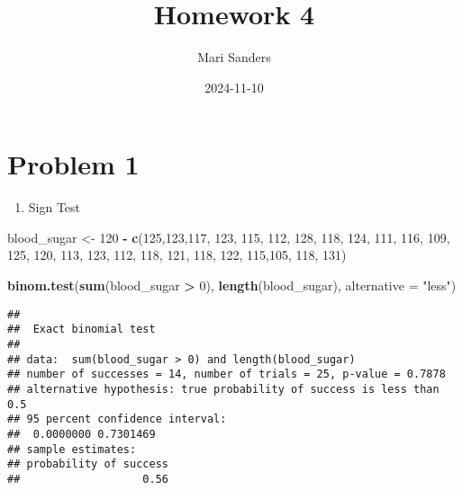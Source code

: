 \documentclass[
]{article}
\title{Homework 4}
\author{Mari Sanders}
\date{2024-11-10}
\newenvironment{Shaded}{\begin{snugshade}}{\end{snugshade}}
\newcommand{\AttributeTok}[1]{\textcolor[rgb]{0.13,0.29,0.53}{#1}}
\newcommand{\DecValTok}[1]{\textcolor[rgb]{0.00,0.00,0.81}{#1}}
\newcommand{\FunctionTok}[1]{\textcolor[rgb]{0.13,0.29,0.53}{\textbf{#1}}}
\newcommand{\NormalTok}[1]{#1}
\newcommand{\OtherTok}[1]{\textcolor[rgb]{0.56,0.35,0.01}{#1}}
\newcommand{\SpecialCharTok}[1]{\textcolor[rgb]{0.81,0.36,0.00}{\textbf{#1}}}
\newcommand{\StringTok}[1]{\textcolor[rgb]{0.31,0.60,0.02}{#1}}
\providecommand{\tightlist}{%
  \setlength{\itemsep}{0pt}\setlength{\parskip}{0pt}}
\begin{document}
\maketitle

\section{Problem 1}\label{problem-1}

\begin{enumerate}
\def\labelenumi{\alph{enumi})}
\tightlist
\item
  Sign Test
\end{enumerate}

\begin{Shaded}
\begin{Highlighting}[]
\NormalTok{blood\_sugar }\OtherTok{\textless{}{-}} \DecValTok{120} \SpecialCharTok{{-}} \FunctionTok{c}\NormalTok{(}\DecValTok{125}\NormalTok{,}\DecValTok{123}\NormalTok{,}\DecValTok{117}\NormalTok{, }\DecValTok{123}\NormalTok{, }\DecValTok{115}\NormalTok{, }\DecValTok{112}\NormalTok{, }\DecValTok{128}\NormalTok{, }\DecValTok{118}\NormalTok{, }\DecValTok{124}\NormalTok{, }\DecValTok{111}\NormalTok{, }\DecValTok{116}\NormalTok{, }
                       \DecValTok{109}\NormalTok{, }\DecValTok{125}\NormalTok{, }\DecValTok{120}\NormalTok{, }\DecValTok{113}\NormalTok{, }\DecValTok{123}\NormalTok{, }\DecValTok{112}\NormalTok{, }\DecValTok{118}\NormalTok{, }\DecValTok{121}\NormalTok{, }\DecValTok{118}\NormalTok{, }\DecValTok{122}\NormalTok{, }\DecValTok{115}\NormalTok{,}\DecValTok{105}\NormalTok{, }
                       \DecValTok{118}\NormalTok{, }\DecValTok{131}\NormalTok{)}

\FunctionTok{binom.test}\NormalTok{(}\FunctionTok{sum}\NormalTok{(blood\_sugar }\SpecialCharTok{\textgreater{}} \DecValTok{0}\NormalTok{), }\FunctionTok{length}\NormalTok{(blood\_sugar), }\AttributeTok{alternative =} \StringTok{"less"}\NormalTok{)}
\end{Highlighting}
\end{Shaded}

\begin{verbatim}
## 
##  Exact binomial test
## 
## data:  sum(blood_sugar > 0) and length(blood_sugar)
## number of successes = 14, number of trials = 25, p-value = 0.7878
## alternative hypothesis: true probability of success is less than 0.5
## 95 percent confidence interval:
##  0.0000000 0.7301469
## sample estimates:
## probability of success 
##                   0.56
\end{verbatim}
\end{document}
